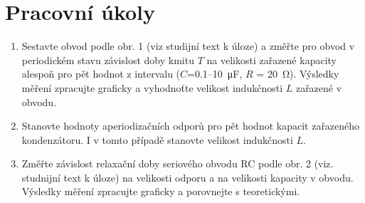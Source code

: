\documentclass[a4paper]{article}
\author{Vladislav Wohlrath}
\begin{document}
\begin{titlepage}

\end{titlepage}

\section*{Pracovní úkoly}
\begin{enumerate}
\item Sestavte obvod podle obr. 1 (viz studijní text k úloze) a změřte pro obvod v periodickém stavu závislost doby kmitu $T$ na velikosti zařazené kapacity alespoň pro pět hodnot z intervalu ($C$=\num{0.1}--\SI{10}{\micro\farad}, $R$ = \SI{20}{\ohm}). Výsledky měření zpracujte graficky a vyhodnoťte velikost indukčnosti $L$ zařazené v obvodu.
\item Stanovte hodnoty aperiodizačních odporů pro pět hodnot kapacit zařazeného kondenzátoru. I v tomto případě stanovte velikost indukčnosti $L$.
\item Změřte závislost relaxační doby seriového obvodu RC podle obr. 2 (viz. studnijní text k úloze) na velikosti odporu a na velikosti kapacity v obvodu. Výsledky měření zpracujte graficky a porovnejte s teoretickými.
\end{enumerate}










\printbibliography[title={Seznam použité literatury}]
\end{document}
